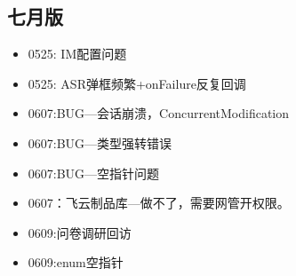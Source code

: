 \documentclass[12pt,a4paper]{ctexart}
\begin{document}
	\subsection{七月版}
	\begin{itemize}
		\item 0525: IM配置问题
		\item 0525: ASR弹框频繁+onFailure反复回调
		
		\item 0607:BUG—会话崩溃，ConcurrentModification
		\item 0607:BUG—类型强转错误
		\item 0607:BUG—空指针问题
		\item 0607：飞云制品库—做不了，需要网管开权限。
		
		\item 0609:问卷调研回访
		\item 0609:enum空指针
		

\end{itemize}
\end{document}
